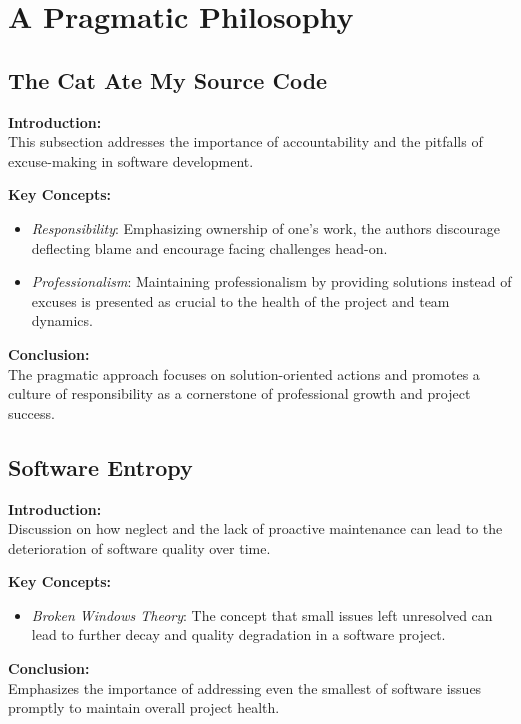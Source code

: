 \section{A Pragmatic Philosophy}

\subsection{The Cat Ate My Source Code}

\textbf{Introduction:} \\
This subsection addresses the importance of accountability and the pitfalls of excuse-making in software development.

\vspace{2mm}
\noindent\textbf{Key Concepts:}
\begin{itemize}
  \item \textit{Responsibility}: Emphasizing ownership of one’s work, the authors discourage deflecting blame and encourage facing challenges head-on.
  \item \textit{Professionalism}: Maintaining professionalism by providing solutions instead of excuses is presented as crucial to the health of the project and team dynamics.
\end{itemize}

\vspace{2mm}
\noindent\textbf{Conclusion:} \\
The pragmatic approach focuses on solution-oriented actions and promotes a culture of responsibility as a cornerstone of professional growth and project success.

\subsection{Software Entropy}

\textbf{Introduction:} \\
Discussion on how neglect and the lack of proactive maintenance can lead to the deterioration of software quality over time.

\vspace{2mm}
\noindent\textbf{Key Concepts:}
\begin{itemize}
  \item \textit{Broken Windows Theory}: The concept that small issues left unresolved can lead to further decay and quality degradation in a software project.
\end{itemize}

\vspace{2mm}
\noindent\textbf{Conclusion:} \\
Emphasizes the importance of addressing even the smallest of software issues promptly to maintain overall project health.

